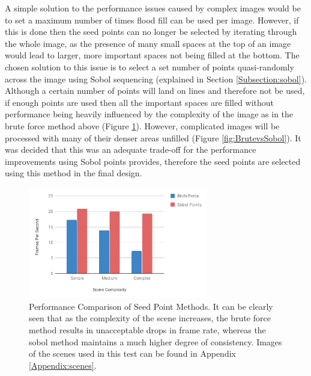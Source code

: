 A simple solution to the performance issues caused by complex images would be to set a maximum number of times flood fill can be used per image. However, if this is done then the seed points can no longer be selected by iterating through the whole image, as the presence of many small spaces at the top of an image would lead to larger, more important spaces not being filled at the bottom. The chosen solution to this issue is to select a set number of points quasi-randomly across the image using Sobol sequencing (explained in Section \ref{Subsection:sobol}). Although a certain number of points will land on lines and therefore not be used, if enough points are used then all the important spaces are filled without performance being heavily influenced by the complexity of the image as in the brute force method above (Figure \ref{fig:fpscomp}). However, complicated images will be processed with many of their denser areas unfilled (Figure \ref{fig:BrutevsSobol}). It was decided that this was an adequate trade-off for the performance improvements using Sobol points provides, therefore the seed points are selected using this method in the final design.

\begin{figure}[H]
    \begin{center}
      \includegraphics[width=0.7\textwidth]{Figures/FPSComp.png}
      \caption[Performance Comparison of Seed Point Methods]{Performance Comparison of Seed Point Methods. It can be clearly seen that as the complexity of the scene increases, the brute force method results in unacceptable drops in frame rate, whereas the sobol method maintains a much higher degree of consistency. Images of the scenes used in this test can be found in Appendix \ref{Appendix:scenes}.}
      \label{fig:fpscomp}
    \end{center}
\end{figure}

